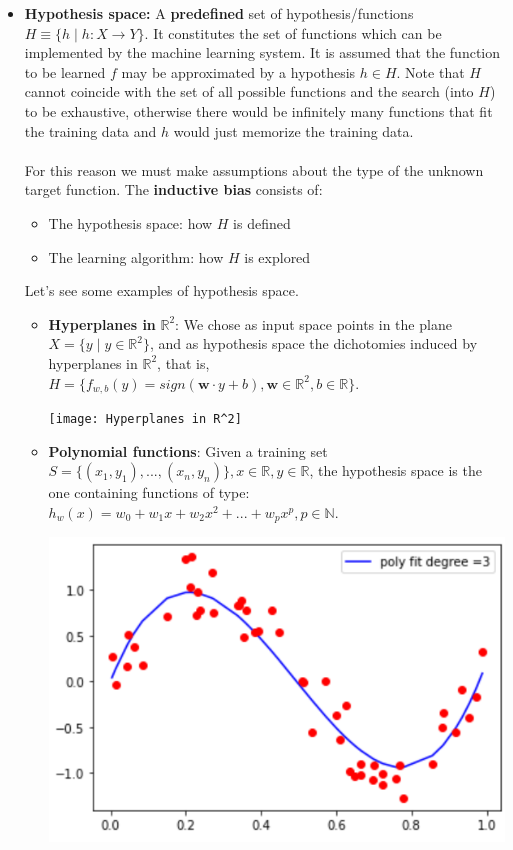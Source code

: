 \begin{itemize}
\item \textbf{Hypothesis space:}
A \textbf{predefined} set of hypothesis/functions $H \equiv \{h\mid h:X \rightarrow Y\}$. It constitutes the set of functions which can be implemented by the machine learning system. It is assumed that the function to be learned $f$ may be
approximated by a hypothesis $h \in H$. Note that $H$ cannot coincide with the set of all possible functions and the search (into $H$) to be exhaustive, otherwise there would be infinitely many functions that fit the training data and $h$ would just memorize the training data.\\\\
For this reason we must make assumptions about the type of the unknown target function. The \textbf{inductive bias} consists of:
\begin{itemize}
    \item The hypothesis space: how $H$ is defined
    \item The learning algorithm: how $H$ is explored
\end{itemize}
Let's see some examples of hypothesis space.
\begin{itemize}
    \item \textbf{Hyperplanes in} $\mathbb{R}^{2}$: We chose as input space points in the plane $X = \{y\mid y \in \mathbb{R}^{2}\}$, and as hypothesis space the dichotomies induced by hyperplanes in $\mathbb{R}^{2}$, that is, $H = \{f_{w,b}(y) = sign(\textbf{w} \cdot y + b), \textbf{w} \in \mathbb{R}^{2}, b \in\mathbb{R}\}$.
    \begin{center}
        \texttt{[image: Hyperplanes in R^2]}
    \end{center}

    
    \item \textbf{Polynomial functions}:
    Given a training set $S = \{(x_{1},y_{1}),...,(x_{n}, y_{n})\}, x\in \mathbb{R}, y\in \mathbb{R}$, the hypothesis space is the one containing functions of type: $h_{w}(x) = w_{0} + w_{1}x + w_{2}x^{2} + ... + w_{p}x^{p}, p\in \mathbb{N}$.
    \begin{center}
        \includegraphics{images/Poly reg.png}
    \end{center}
\end{itemize}
\end{itemize}

